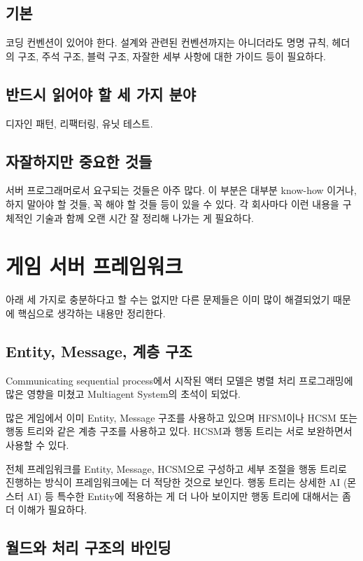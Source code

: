 \documentclass[chapter,kosection, 10.5pt, romanfixed, a4paper]{oblivoir}
\begin{document}
\subsection{기본}

코딩 컨벤션이 있어야 한다. 설계와 관련된 컨벤션까지는 아니더라도 명명 규칙, 헤더의 구조, 
주석 구조, 블럭 구조, 자잘한 세부 사항에 대한 가이드 등이 필요하다. 

\subsection{반드시 읽어야 할 세 가지 분야}

디자인 패턴, 리팩터링, 유닛 테스트. 

\subsection{자잘하지만 중요한 것들}

서버 프로그래머로서 요구되는 것들은 아주 많다. 이 부분은 대부분 know-how 이거나, 하지 말아야 할 것들, 
꼭 해야 할 것들 등이 있을 수 있다. 각 회사마다 이런 내용을 구체적인 기술과 함께 
오랜 시간 잘 정리해 나가는 게 필요하다. 
 
\section{게임 서버 프레임워크}

아래 세 가지로 충분하다고 할 수는 없지만 다른 문제들은 이미 많이 해결되었기 때문에 
핵심으로 생각하는 내용만 정리한다. 

\subsection{Entity, Message, 계층 구조}

Communicating sequential process에서 시작된 액터 모델은 병렬 처리 프로그래밍에 많은 영향을 미쳤고 
Multiagent System의 초석이 되었다. 

많은 게임에서 이미 Entity, Message 구조를 사용하고 있으며 HFSM이나 HCSM 또는 행동 트리와 같은 
계층 구조를 사용하고 있다. HCSM과 행동 트리는 서로 보완하면서 사용할 수 있다. 

전체 프레임워크를 Entity, Message, HCSM으로 구성하고 세부 조절을 행동 트리로 진행하는 방식이 프레임워크에는
더 적당한 것으로 보인다. 행동 트리는 상세한 AI (몬스터 AI) 등 특수한 Entity에 적용하는 게 더 나아 보이지만 
행동 트리에 대해서는 좀 더 이해가 필요하다. 

\subsection{월드와 처리 구조의 바인딩}
\end{document}
